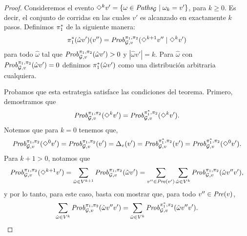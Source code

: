 \fi
\begin{proof}
  Consideremos el evento $\Diamond^{k} v' = \{ \omega \in
  \mathit{Paths}_{\mathcal{G}} \mid \omega_k = v'\}$, para $k\geq 0$. Es decir,
  el conjunto de corridas en las cuales $v'$ es alcanzado en exactamente $k$ pasos.
  Definimos $\pi^*_{1}$ de la siguiente manera:
  \[
  \pi^*_{1}(\hat{\omega}v')(v'') =  \mathit{Prob}^{\pi_{1}, \pi_{2}}_{\mathcal{G},v}(\Diamond^{k+1} v'' \mid \Diamond^k v') 
  \]
  para todo $\hat{\omega}$ tal que
  $\mathit{Prob}^{\pi_{1}, \pi_{2}}_{\mathcal{G},v}(\hat{\omega}v') > 0$ y
  $|\hat{\omega}v'| = k$.  Para $\hat{\omega}$ con
  $\mathit{Prob}^{\pi_{1}, \pi_{2}}_{\mathcal{G},v}(\hat{\omega}v') = 0$ definimos $\pi^*_{1}(\hat{\omega}v')$ como una distribución arbitraria cualquiera.

  Probamos que esta estrategia satisface las condiciones del teorema.
  Primero, demostramos que
  \begin{equation}\label{equ:diamondk}
    \mathit{Prob}^{\pi_{1}, \pi_{2}}_{\mathcal{G},v}(\Diamond^{k} v') =
    \mathit{Prob}^{\pi^*_{1}, \pi_{2}}_{\mathcal{G},v}(\Diamond^{k} v').
  \end{equation}
  Notemos que para $k=0$ tenemos que,
  \[\mathit{Prob}^{\pi_{1}, \pi_{2}}_{\mathcal{G},v}(\Diamond^{0} v') =
  \mathit{Prob}^{\pi_{1}, \pi_{2}}_{\mathcal{G},v}(v') = \Delta_v(v') =
  \mathit{Prob}^{\pi^*_{1}, \pi_{2}}_{\mathcal{G},v}(v')=
  \mathit{Prob}^{\pi^*_{1}, \pi_{2}}_{\mathcal{G},v}(\Diamond^{0} v').\]
  Para $k + 1 > 0$, notamos que
  \[
  \mathit{Prob}^{\pi_{1}, \pi_{2}}_{\mathcal{G},v}(\Diamond^{k+1} v') = \sum_{\hat{\omega} \in V^{k+1}} \mathit{Prob}^{\pi_{1}, \pi_{2}}_{\mathcal{G},v}(\hat{\omega}v')  = \sum_{v'' \in \mathit{Pre}(v')}\sum_{\hat{\omega} \in V^k} \mathit{Prob}^{\pi_{1}, \pi_{2}}_{\mathcal{G},v}(\hat{\omega}v''v'),
  \] 
  y por lo tanto, para este caso, basta con mostrar que, para todo
  $v''\in\mathit{Pre}(v)$,
  \[
    \sum_{\hat{\omega} \in V^k} \mathit{Prob}^{\pi_{1}, \pi_{2}}_{\mathcal{G},v}(\hat{\omega}v''v') = \sum_{\hat{\omega} \in V^k} \mathit{Prob}^{\pi^*_{1}, \pi_{2}}_{\mathcal{G},v}(\hat{\omega}v''v').
  \]


\end{proof}
